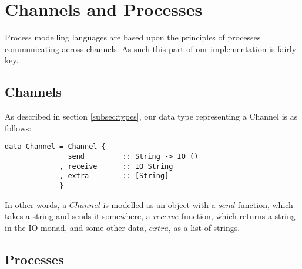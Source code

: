 \section{Channels and Processes}
\label{sec:channels}

Process modelling languages are based upon the principles of processes communicating across channels. As such this part of our implementation is fairly key. 

\subsection{Channels}

As described in section \ref{subsec:types}, our data type representing a Channel is as follows:

\begin{verbatim}
data Channel = Channel {
               send         :: String -> IO ()
             , receive      :: IO String
             , extra        :: [String]
             }
\end{verbatim}

In other words, a $Channel$ is modelled as an object with a $send$ function, which takes a string and sends it somewhere, a $receive$ function, which returns a string in the IO monad, and some other data, $extra$, as a list of strings.

\subsection{Processes}


